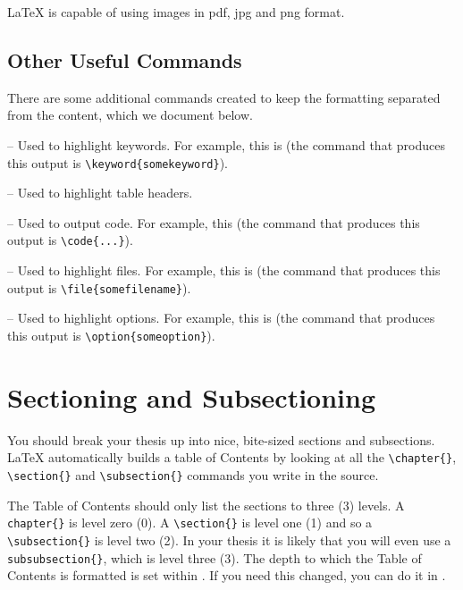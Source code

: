\LaTeX{} is capable of using images in pdf, jpg and png format.

\subsection{Other Useful Commands}

There are some additional commands created to keep the formatting separated from the content, which we document below.

 -- Used to highlight keywords. For example, this is  (the command that produces this output is \verb|\keyword{somekeyword}|).

 -- Used to highlight table headers. 

 -- Used to output code. For example, this  (the command that produces this output is \verb|\code{...}|).

 -- Used to highlight files. For example, this is  (the command that produces this output is \verb|\file{somefilename}|).

 -- Used to highlight options. For example, this is  (the command that produces this output is \verb|\option{someoption}|).


\section{Sectioning and Subsectioning}

You should break your thesis up into nice, bite-sized sections and subsections. \LaTeX{} automatically builds a table of Contents by looking at all the \verb|\chapter{}|, \verb|\section{}|  and \verb|\subsection{}| commands you write in the source.

The Table of Contents should only list the sections to three (3) levels. A \verb|chapter{}| is level zero (0). A \verb|\section{}| is level one (1) and so a \verb|\subsection{}| is level two (2). In your thesis it is likely that you will even use a \verb|subsubsection{}|, which is level three (3). The depth to which the Table of Contents is formatted is set within . If you need this changed, you can do it in .

